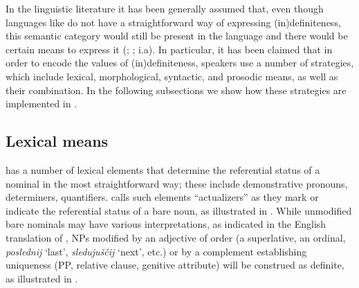 \documentclass[output=paper]{langscibook}
\begin{document}
In the linguistic literature it has been generally assumed that, even though languages like  do not have a straightforward way of expressing (in)defi\-nite\-ness, this semantic category would still be present in the language and there would be certain means to express it (\citealt{GalkinaFedoruk1963}; \citealt{Pospelov1970}; i.a). %
In particular, it has been claimed
that in order to encode the values of (in)defi\-nite\-ness,  speakers use a number of strategies, which include lexical, %
morphological, syntactic, and prosodic means, as well as %
their combination. In the following subsections we show how these strategies are implemented in .

\subsection{Lexical means}
 has a number of lexical elements that determine the referential status of a nominal in the most straightforward way; these include demonstrative pronouns, determiners, quantifiers. \citet{Paduceva1985} calls such elements ``actualizers'' as they mark or indicate the referential status of a bare noun, as illustrated in . While unmodified bare nominals may have various interpretations, as indicated in the English translation of
, NPs modified by an adjective of order (a superlative, an ordinal, \textit{poslednij} `last', \textit{sledujuščij}  `next', etc.) %
or by a complement establishing uniqueness (PP, relative clause, genitive attribute) %
will be construed as definite, as illustrated in .

\end{document}
